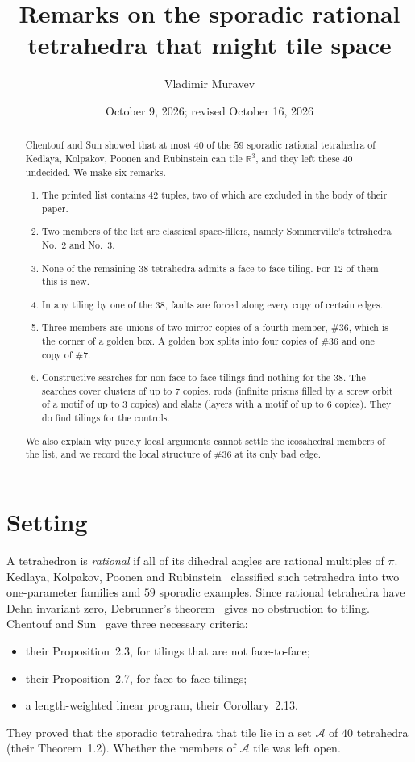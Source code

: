 \documentclass[11pt]{amsart}
\title{Remarks on the sporadic rational tetrahedra that might tile space}
\author{Vladimir Muravev}
\date{October 9, 2026; revised October 16, 2026}
\theoremstyle{definition}
\newcommand{\cA}{\mathscr{A}}
\newcommand{\R}{\mathbb{R}}
\begin{document}
\begin{abstract}
Chentouf and Sun showed that at most $40$ of the $59$ sporadic rational tetrahedra of Kedlaya, Kolpakov, Poonen and
Rubinstein can tile $\R^3$, and they left these $40$ undecided. We make six remarks.
\begin{enumerate}[leftmargin=1.5em]
\item The printed list contains $42$ tuples, two of which are excluded in the body of their paper.
\item Two members of the list are classical space-fillers, namely Sommerville's tetrahedra No.~2 and No.~3.
\item None of the remaining $38$ tetrahedra admits a face-to-face tiling. For $12$ of them this is new.
\item In any tiling by one of the $38$, faults are forced along every copy of certain edges.
\item Three members are unions of two mirror copies of a fourth member, $\#36$, which is the corner of a golden box. A
golden box splits into four copies of $\#36$ and one copy of $\#7$.
\item Constructive searches for non-face-to-face tilings find nothing for the $38$. The searches cover clusters of up to
$7$ copies, rods (infinite prisms filled by a screw orbit of a motif of up to $3$ copies) and slabs (layers with a motif
of up to $6$ copies). They do find tilings for the controls.
\end{enumerate}
We also explain why purely local arguments cannot settle the icosahedral members of the list, and we record the local
structure of $\#36$ at its only bad edge.
\end{abstract}
\maketitle

\section{Setting}
A tetrahedron is \emph{rational} if all of its dihedral angles are rational multiples of $\pi$. Kedlaya, Kolpakov,
Poonen and Rubinstein~\cite{KKPR} classified such tetrahedra into two one-parameter families and $59$ sporadic
examples. Since rational tetrahedra have Dehn invariant zero, Debrunner's theorem~\cite{Deb} gives no obstruction to
tiling. Chentouf and Sun~\cite{CS} gave three necessary criteria:
\begin{itemize}[leftmargin=1.5em]
\item their Proposition~2.3, for tilings that are not face-to-face;
\item their Proposition~2.7, for face-to-face tilings;
\item a length-weighted linear program, their Corollary~2.13.
\end{itemize}
They proved that the sporadic tetrahedra that tile lie in a set $\cA$ of $40$ tetrahedra (their Theorem~1.2).
Whether the members of $\cA$ tile was left open.
\end{document}
